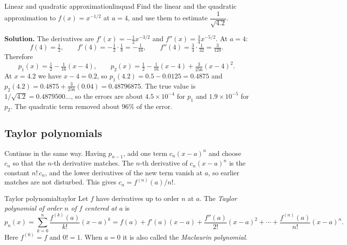 \documentclass[11pt]{article}
\begin{document}
\begin{exmp}{Linear and quadratic approximation}{linquad}
Find the linear and the quadratic approximation to $f(x)=x^{-1/2}$ at $a=4$, and use them to estimate $\dfrac1{\sqrt{4.2}}$.

\textbf{Solution.} The derivatives are $f'(x)=-\frac12x^{-3/2}$ and $f''(x)=\frac34x^{-5/2}$. At $a=4$:
\[
f(4)=\tfrac12,\qquad f'(4)=-\tfrac12\cdot\tfrac18=-\tfrac1{16},\qquad f''(4)=\tfrac34\cdot\tfrac1{32}=\tfrac3{128}.
\]
Therefore
\[
p_1(x)=\tfrac12-\tfrac1{16}(x-4),\qquad p_2(x)=\tfrac12-\tfrac1{16}(x-4)+\tfrac3{256}(x-4)^2 .
\]
At $x=4.2$ we have $x-4=0.2$, so $p_1(4.2)=0.5-0.0125=0.4875$ and $p_2(4.2)=0.4875+\frac3{256}(0.04)=0.48796875$. The true value is $1/\sqrt{4.2}=0.4879500\ldots$, so the errors are about $4.5\times10^{-4}$ for $p_1$ and $1.9\times10^{-5}$ for $p_2$. The quadratic term removed about $96\%$ of the error.
\end{exmp}

\subsection*{Taylor polynomials}

Continue in the same way. Having $p_{n-1}$, add one term $c_n(x-a)^n$ and choose $c_n$ so that the $n$-th derivative matches. The $n$-th derivative of $c_n(x-a)^n$ is the constant $n!\,c_n$, and the lower derivatives of the new term vanish at $a$, so earlier matches are not disturbed. This gives $c_n=f^{(n)}(a)/n!$.

\begin{defn}{Taylor polynomial}{taylor}
Let $f$ have derivatives up to order $n$ at $a$. The \emph{Taylor polynomial of order $n$ of $f$ centered at $a$} is
\[
p_n(x)=\sum_{k=0}^n\frac{f^{(k)}(a)}{k!}(x-a)^k=f(a)+f'(a)(x-a)+\frac{f''(a)}{2!}(x-a)^2+\cdots+\frac{f^{(n)}(a)}{n!}(x-a)^n .
\]
Here $f^{(0)}=f$ and $0!=1$. When $a=0$ it is also called the \emph{Maclaurin polynomial}.
\end{defn}
\end{document}
